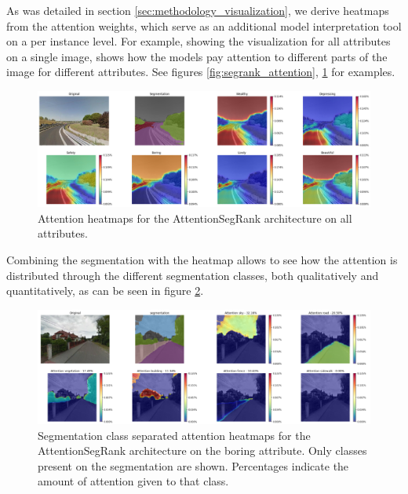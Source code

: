 As was detailed in section \ref{sec:methodology_visualization}, we  derive heatmaps
from the attention weights, which serve as an additional model interpretation
tool on a per instance level. For example, showing the visualization for all attributes on
a single image, shows how the models pay attention to different parts of the image for different
attributes. See figures \ref{fig:segrank_attention}, \ref{fig:vis_sample} for examples.

\begin{figure}[ht]
	\begin{center}
	\includegraphics[width=1\textwidth]{./figures/vis_samples(seg_attn).png}
	\caption[Multi attribute Visualization Sample]{
        Attention heatmaps for the AttentionSegRank architecture on all attributes.
        }
	\label{fig:vis_sample}
	\end{center}
\end{figure}

Combining the segmentation with the heatmap allows to see how the attention is distributed
through the different segmentation classes, both qualitatively and quantitatively, as can
be seen in figure \ref{fig:object_attention}.

\begin{figure}[ht]
	\begin{center}
	\includegraphics[width=1\textwidth]{./figures/object_attention.png}
	\caption[Attention by segmentation class heatmaps.]{
		Segmentation class separated attention heatmaps for the AttentionSegRank architecture on the boring attribute.
		Only classes present on the segmentation are shown. Percentages indicate the amount of attention given to that
		class.
        }
	\label{fig:object_attention}
	\end{center}
\end{figure}

